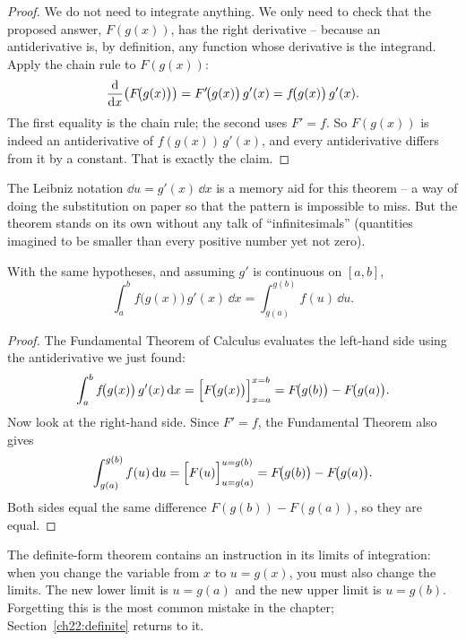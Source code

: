 \begin{proof}
We do not need to integrate anything. We only need to check that the proposed
answer, $F(g(x))$, has the right derivative -- because an antiderivative is, by
definition, any function whose derivative is the integrand. Apply the chain rule
to $F(g(x))$:
\[
  \frac{\mathrm{d}}{\mathrm{d} x}\!\left(F\!\big(g(x)\big)\right) = F'\!\big(g(x)\big)\,g'(x) = f\!\big(g(x)\big)\,g'(x).
\]
The first equality is the chain rule; the second uses $F'=f$. So $F(g(x))$ is
indeed an antiderivative of $f(g(x))\,g'(x)$, and every antiderivative differs from
it by a constant. That is exactly the claim.
\end{proof}

The Leibniz notation $\dd u = g'(x)\,\dd x$ is a
memory aid for this theorem -- a way of doing the substitution on paper so
that the pattern is impossible to miss. But the theorem stands on its own without
any talk of ``infinitesimals'' (quantities imagined to be smaller than every
positive number yet not zero).

\begin{theorem}
\label{ch22:thm-def}
With the same hypotheses, and assuming $g'$ is continuous on $[a,b]$,
\[
  \int_a^b f\!\big(g(x)\big)\,g'(x)\,\dd x
   = \int_{g(a)}^{g(b)} f(u)\,\dd u.
\]
\end{theorem}

\begin{proof}
The Fundamental Theorem of Calculus evaluates the left-hand side using the
antiderivative we just found:
\[
  \int_a^b f\!\big(g(x)\big)\,g'(x)\,\mathrm{d} x
   = \Big[F\!\big(g(x)\big)\Big]_{x=a}^{x=b}
   = F\!\big(g(b)\big) - F\!\big(g(a)\big).
\]
Now look at the right-hand side. Since $F'=f$, the Fundamental Theorem also gives
\[
  \int_{g(a)}^{g(b)} f(u)\,\mathrm{d} u = \Big[F(u)\Big]_{u=g(a)}^{u=g(b)}
   = F\!\big(g(b)\big) - F\!\big(g(a)\big).
\]
Both sides equal the same difference $F(g(b)) - F(g(a))$, so they are equal.
\end{proof}

\begin{focusbox}
The definite-form theorem contains an instruction in its limits of
integration: when you change the variable from $x$ to $u = g(x)$, you must also
change the limits. The new lower limit is $u = g(a)$ and the new upper limit is
$u = g(b)$. Forgetting this is the most common mistake in the chapter;
Section~\ref{ch22:definite} returns to it.
\end{focusbox}

